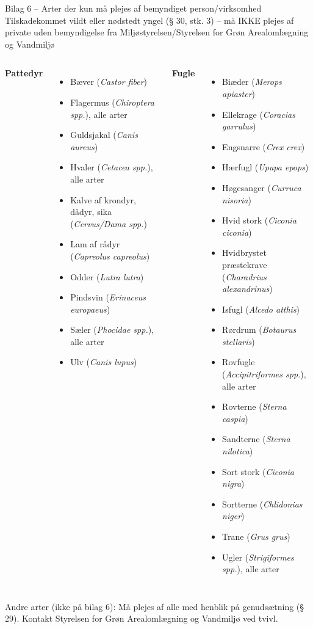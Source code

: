 \begin{frame}{Bilag 6 – Arter der kun må plejes af bemyndiget person/virksomhed}
\tiny
Tilskadekommet vildt eller nødstedt yngel (§ 30, stk. 3) – må IKKE plejes af private uden bemyndigelse fra Miljøstyrelsen/Styrelsen for Grøn Arealomlægning og Vandmiljø

\begin{columns}[T]
\textbf{Pattedyr}
\begin{itemize}
  \item Bæver (\textit{Castor fiber})
  \item Flagermus (\textit{Chiroptera spp.}), alle arter
  \item Guldsjakal (\textit{Canis aureus})
  \item Hvaler (\textit{Cetacea spp.}), alle arter
  \item Kalve af krondyr, dådyr, sika (\textit{Cervus/Dama spp.})
  \item Lam af rådyr (\textit{Capreolus capreolus})
  \item Odder (\textit{Lutra lutra})
  \item Pindsvin (\textit{Erinaceus europaeus})
  \item Sæler (\textit{Phocidae spp.}), alle arter
  \item Ulv (\textit{Canis lupus})
\end{itemize}

\textbf{Fugle}
\begin{itemize}
  \item Biæder (\textit{Merops apiaster})
  \item Ellekrage (\textit{Coracias garrulus})
  \item Engsnarre (\textit{Crex crex})
  \item Hærfugl (\textit{Upupa epops})
  \item Høgesanger (\textit{Curruca nisoria})
  \item Hvid stork (\textit{Ciconia ciconia})
  \item Hvidbrystet præstekrave (\textit{Charadrius alexandrinus})
  \item Isfugl (\textit{Alcedo atthis})
  \item Rørdrum (\textit{Botaurus stellaris})
  \item Rovfugle (\textit{Accipitriformes spp.}), alle arter
  \item Rovterne (\textit{Sterna caspia})
  \item Sandterne (\textit{Sterna nilotica})
  \item Sort stork (\textit{Ciconia nigra})
  \item Sortterne (\textit{Chlidonias niger})
  \item Trane (\textit{Grus grus})
  \item Ugler (\textit{Strigiformes spp.}), alle arter
\end{itemize}
\end{columns}

\tiny
Andre arter (ikke på bilag 6): Må plejes af alle med henblik på genudsætning (§ 29). Kontakt Styrelsen for Grøn Arealomlægning og Vandmiljø ved tvivl.
\end{frame}

